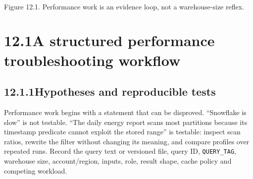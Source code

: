 \documentclass[11pt,twoside]{article}
\newcommand{\topic}[2]{\subsection*{#1\quad #2}}
\begin{document}
\begin{center}\\{\fontsize{8}{9}\selectfont\color{inkgray}Figure 12.1. Performance work is an evidence loop, not a warehouse-size reflex.}\end{center}
\newpage
\section*{12.1\quad A structured performance troubleshooting workflow}
\topic{12.1.1}{Hypotheses and reproducible tests}
Performance work begins with a statement that can be disproved. ``Snowflake is slow'' is not testable. ``The daily energy report scans most partitions because its timestamp predicate cannot exploit the stored range'' is testable: inspect scan ratios, rewrite the filter without changing its meaning, and compare profiles over repeated runs. Record the query text or versioned file, query ID, \texttt{QUERY\_TAG}, warehouse size, account/region, inputs, role, result shape, cache policy and competing workload.
\end{document}
